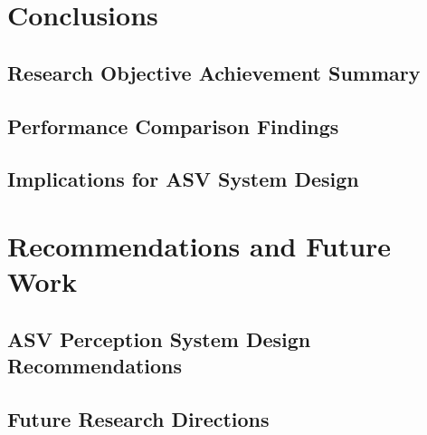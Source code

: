 \documentclass{erauthesis}
\begin{document}
\chapter{Conclusions}


\section{Research Objective Achievement Summary}

\section{Performance Comparison Findings}

\section{Implications for ASV System Design}

\chapter{Recommendations and Future Work}


\section{ASV Perception System Design Recommendations}

\section{Future Research Directions}
\end{document}
